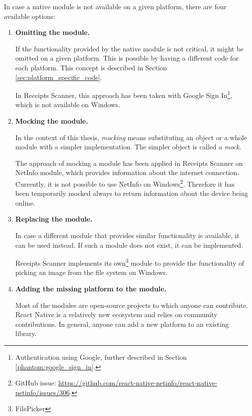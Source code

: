 \documentclass[
  digital, %
  table,   %
  oneside, %
  lof,     %
  lot,     %
]{fithesis3}
\begin{document}
In case a native module is not available on a given platform, there are four available options:
\begin{enumerate}
    \item \textbf{Omitting the module.} 
    
    If the functionality provided by the native module is not critical, it might be omitted on a given platform. This is possible by having a different code for each platform. This concept is described in Section \ref{sec:platform_specific_code}.
    
    In Receipts Scanner, this approach has been taken with Google Sign In\footnote{Authentication using Google, further described in Section \ref{phantom:google_sign_in}.}, which is not available on Windows.
    
    \item \textbf{Mocking the module.}
    
    In the context of this thesis, \textit{mocking} means substituting an object or a whole module with a simpler implementation. The simpler object is called a \textit{mock}.
    
    The approach of mocking a module has been applied in Receipts Scanner on NetInfo module, which provides information about the internet connection. Currently, it is not possible to use NetInfo on Windows\footnote{GitHub issue: \url{https://github.com/react-native-netinfo/react-native-netinfo/issues/306}.}. Therefore it has been temporarily mocked always to return information about the device being online.
    
    \item \textbf{Replacing the module.} 
    
    In case a different module that provides similar functionality is available, it can be used instead. If such a module does not exist, it can be implemented.
    
    Receipts Scanner implements its own\footnote{FilePicker} module to provide the functionality of picking an image from the file system on Windows.
    
    \item \textbf{Adding the missing platform to the module.}
    
    Most of the modules are open-source projects to which anyone can contribute. React Native is a relatively new ecosystem and relies on community contributions. In general, anyone can add a new platform to an existing library.
\end{enumerate}
\end{document}
